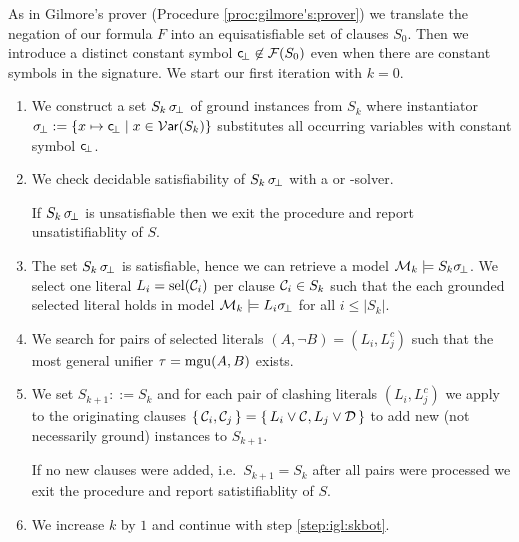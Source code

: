\begin{procedure}\label{proc:inst:gen:loop}
	As in Gilmore's prover (Procedure \ref{proc:gilmore's:prover}) 
	we translate the negation of our formula $F$ into an equisatisfiable set of clauses 
	$S_0$. Then we introduce a distinct constant symbol 
	${\mathsf c}\!_\bot\not\in{\mathcal F}(S_0)$ even when there are constant symbols in the signature. 
	We start our first iteration with $k=0$.
	
	\begin{enumerate}
		\item\label{step:igl:skbot}
		We construct a set $S_{k}\,\sigma\!_\bot$ of ground instances from $S_k$
		where instantiator $\sigma\!_\bot := \{ x\mapsto {\mathsf c}\!_\bot \mid x\in\operatorname{\mathcal{V}\mathsf{ar}}(S_k) \} $ 
		substitutes all occurring variables with constant symbol ${\mathsf c}\!_\bot$.
%		
		\item\label{step:igl:sksat} We check decidable satisfiability of $S_k\,\sigma\!_\bot$ with a \SAT or \SMT-solver.
		
		If $S_k\,\sigma\!_\bot$ is unsatisfiable then we exit the procedure and report {\myem unsatistifiablity of $S$}.
		
		\item\label{step:igl:model} The set $S_k\,\sigma\!_\bot$ is satisfiable, hence we can retrieve a model ${\mathcal M}_k \models S_k\sigma\!_\bot$.
		We select one literal $L_i = \operatorname{sel}({\mathcal C}_i)$ per clause ${\mathcal C}_i \in S_k$ 
		such that the each grounded selected literal holds in model
		${\mathcal M}_k\models L_i\sigma\!_\bot$ for all $i\leq | S_k |$.
		
		\item\label{step:igl:clashes} We search for pairs of selected literals $(A, \lnot B) = (L_i, L_j^c)$
		such that the most general unifier $\tau = \operatorname{mgu}(A,B)$ exists.
		
		\item We set $S_{k+1} ::= S_k$ and for each pair of clashing literals $(L_i, L^c_j)$ 
		we apply \InstGen to the originating clauses 
		$\{\, {\mathcal C}_{i}, {\mathcal C}_{j}\, \} = \{\,L_i\lor{\mathcal C}, L_j\lor{\mathcal D}\,\}$
		to add new (not necessarily ground) instances to $S_{k+1}$.
		
		If no new clauses were added, i.e.~$S_{k+1} = S_k$ after all pairs were processed we exit the procedure and report {\myem satistifiablity of $S$}.
		
		\item We increase $k$ by $1$ and continue with step \ref{step:igl:skbot}. 
		
	\end{enumerate}
	


\end{procedure}
